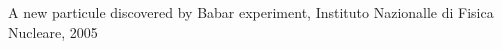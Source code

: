 \documentclass[preview]{standalone}
\begin{document}
\begin{center}
A new particule discovered by Babar experiment, Instituto Nazionalle di Fisica Nucleare, 2005
\end{center}
\end{document}
